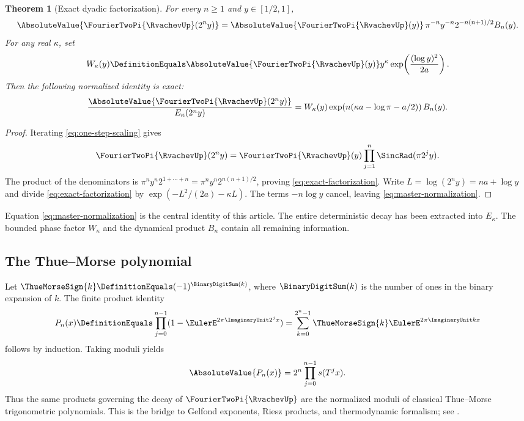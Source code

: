 \documentclass[11pt,oneside]{article}
\numberwithin{equation}{section}
\newtheorem{theorem}{Theorem}[section]
\theoremstyle{definition}
\theoremstyle{remark}
\begin{document}
\begin{theorem}[Exact dyadic factorization]
\label{thm:exact-dyadic-factorization}
For every $n\ge1$ and $y\in[1/2,1]$,
\begin{equation}
 \AbsoluteValue{\FourierTwoPi{\RvachevUp}(2^n y)}
 =\AbsoluteValue{\FourierTwoPi{\RvachevUp}(y)}\,\pi^{-n}y^{-n}2^{-n(n+1)/2}B_n(y).
 \label{eq:exact-factorization}
\end{equation}
For any real $\kappa$, set
\begin{equation}
 W_\kappa(y)
 \DefinitionEquals\AbsoluteValue{\FourierTwoPi{\RvachevUp}(y)}y^\kappa
   \exp\!\left(\frac{(\log y)^2}{2a}\right).
 \label{eq:W-kappa}
\end{equation}
Then the following normalized identity is exact:
\begin{equation}
 \frac{\AbsoluteValue{\FourierTwoPi{\RvachevUp}(2^n y)}}{E_\kappa(2^n y)}
 =W_\kappa(y)
  \exp\!\left(n(\kappa a-\log\pi-a/2)\right)B_n(y).
 \label{eq:master-normalization}
\end{equation}
\end{theorem}

\begin{proof}
Iterating \eqref{eq:one-step-scaling} gives
\[
 \FourierTwoPi{\RvachevUp}(2^n y)=\FourierTwoPi{\RvachevUp}(y)\prod_{j=1}^{n}\SincRad(\pi2^j y).
\]
The product of the denominators is
$\pi^ny^n2^{1+\cdots+n}=\pi^ny^n2^{n(n+1)/2}$, proving
\eqref{eq:exact-factorization}.  Write $L=\log(2^ny)=na+\log y$ and divide
\eqref{eq:exact-factorization} by
$\exp(-L^2/(2a)-\kappa L)$.  The terms $-n\log y$ cancel, leaving
\eqref{eq:master-normalization}.
\end{proof}

Equation \eqref{eq:master-normalization} is the central identity of this article.  The
entire deterministic decay has been extracted into $E_\kappa$.  The bounded phase factor
$W_\kappa$ and the dynamical product $B_n$ contain all remaining information.

\subsection{The Thue--Morse polynomial}

Let $\ThueMorseSign{k}\DefinitionEquals(-1)^{\BinaryDigitSum(k)}$, where
$\BinaryDigitSum(k)$ is the number of ones in the binary expansion of
$k$.  The finite product identity
\begin{equation}
 P_n(x)\DefinitionEquals\prod_{j=0}^{n-1}(1-\EulerE^{2\pi\ImaginaryUnit2^jx})
 =\sum_{k=0}^{2^n-1}\ThueMorseSign{k}\EulerE^{2\pi\ImaginaryUnit kx}
 \label{eq:TM-polynomial}
\end{equation}
follows by induction.  Taking moduli yields
\begin{equation}
 \AbsoluteValue{P_n(x)}=2^n\prod_{j=0}^{n-1}s(T^jx).
 \label{eq:TM-modulus}
\end{equation}
Thus the same products governing the decay of $\FourierTwoPi{\RvachevUp}$ are the normalized moduli of
classical Thue--Morse trigonometric polynomials.  This is the bridge to Gelfond exponents,
Riesz products, and thermodynamic formalism; see \cite{gelfond,queffelec,fan-schmeling-shen}.
\end{document}
